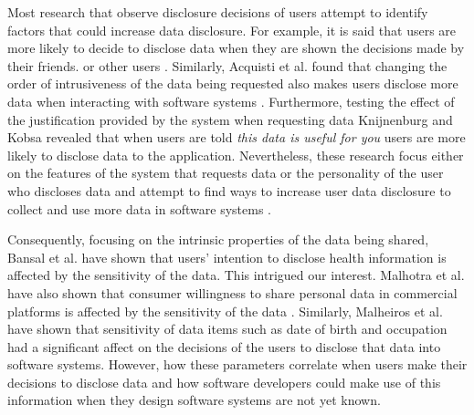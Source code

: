 \documentclass[10pt]{article}
\begin{document}
Most research that observe disclosure decisions of users attempt to identify factors that could increase data disclosure. For example, it is said that users are more likely to decide to disclose data when they are shown the decisions made by their friends. \cite {dennett2000little} or other users \cite {besmer2010impact}. Similarly, Acquisti et al. found that changing the order of intrusiveness of the data being requested also makes users disclose more data when interacting with software systems \cite {acquisti2012impact}. Furthermore, testing the effect of the justification provided by the system when requesting data Knijnenburg and Kobsa \cite {knijnenburg2013helping} revealed that when users are told \textit{this data is useful for you} users are more likely to disclose data to the application. Nevertheless, these research focus either on the features of the system that requests data \cite {li2010understanding, wang2016context, malheiros2013fairly} or the personality of the user who discloses data \cite {nissenbaum2009privacy} and attempt to find ways to increase user data disclosure to collect and use more data in software systems \cite {dennett2000little}. 

Consequently, focusing on the intrinsic properties of the data being shared, Bansal et al. have shown that users' intention to disclose health information is affected by the sensitivity of the data\cite {bansal2010impact}. This intrigued our interest. Malhotra et al. have also shown that consumer willingness to share personal data in commercial platforms is affected by the sensitivity of the data \cite {malhotra2004internet}. Similarly, Malheiros et al. \cite {malheiros2013fairly} have shown that sensitivity of data items such as date of birth and occupation had a significant affect on the decisions of the users to disclose that data into software systems. However, how these parameters correlate when users make their decisions to disclose data and how software developers could make use of this information when they design software systems are not yet known.
\end{document}
